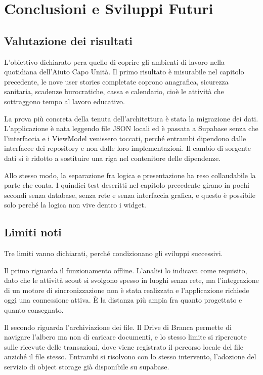 \documentclass[11pt]{article}
\numberwithin{figure}{section}
\begin{document}
\section{Conclusioni e Sviluppi Futuri}

\subsection{Valutazione dei risultati}

L'obiettivo dichiarato pera quello di coprire gli ambienti di lavoro nella quotidiana dell'Aiuto Capo Unità. Il primo risultato è misurabile nel capitolo precedente, le nove user stories completate coprono anagrafica, sicurezza sanitaria, scadenze burocratiche, cassa e calendario, cioè le attività che sottraggono tempo al lavoro educativo.

La prova più concreta della tenuta dell'architettura è stata la migrazione dei dati. L'applicazione è nata leggendo file JSON locali ed è passata a Supabase senza che l'interfaccia e i ViewModel venissero toccati, perché entrambi dipendono dalle interfacce dei repository e non dalle loro implementazioni. Il cambio di sorgente dati si è ridotto a sostituire una riga nel contenitore delle dipendenze.

Allo stesso modo, la separazione fra logica e presentazione ha reso collaudabile la parte che conta. I quindici test descritti nel capitolo precedente girano in pochi secondi senza database, senza rete e senza interfaccia grafica, e questo è possibile solo perché la logica non vive dentro i widget.

\subsection{Limiti noti}

Tre limiti vanno dichiarati, perché condizionano gli sviluppi successivi.

Il primo riguarda il funzionamento offline. L'analisi lo indicava come requisito, dato che le attività scout si svolgono spesso in luoghi senza rete, ma l'integrazione di un motore di sincronizzazione non è stata realizzata e l'applicazione richiede oggi una connessione attiva. È la distanza più ampia fra quanto progettato e quanto consegnato.

Il secondo riguarda l'archiviazione dei file. Il Drive di Branca permette di navigare l'albero ma non di caricare documenti, e lo stesso limite si ripercuote sulle ricevute delle transazioni, dove viene registrato il percorso locale del file anziché il file stesso. Entrambi si risolvono con lo stesso intervento, l'adozione del servizio di object storage già disponibile su supabase.
\end{document}
